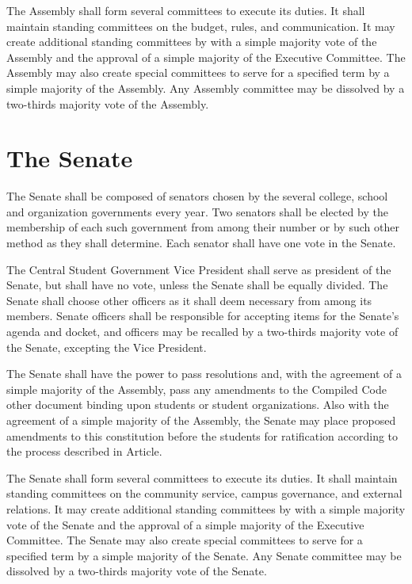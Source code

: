     The Assembly shall form several committees to execute its duties. It shall maintain standing committees on the budget, rules, and communication. It may create additional standing committees by with a simple majority vote of the Assembly and the approval of a simple majority of the Executive Committee. The Assembly may also create special committees to serve for a specified term by a simple majority of the Assembly. Any Assembly committee may be dissolved by a two-thirds majority vote of the Assembly.


\section{The Senate}
    The Senate shall be composed of senators chosen by the several college, school and organization governments every year. Two senators shall be elected by the membership of each such government from among their number or by such other method as they shall determine. Each senator shall have one vote in the Senate.

    The Central Student Government Vice President shall serve as president of the Senate, but shall have no vote, unless the Senate shall be equally divided. The Senate shall choose other officers as it shall deem necessary from among its members. Senate officers shall be responsible for accepting items for the Senate's agenda and docket, and officers may be recalled by a two-thirds majority vote of the Senate, excepting the Vice President.

    The Senate shall have the power to pass resolutions and, with the agreement of a simple majority of the Assembly, pass any amendments to the Compiled Code other document binding upon students or student organizations. Also with the agreement of a simple majority of the Assembly, the Senate may place proposed amendments to this constitution before the students for ratification according to the process described in Article.

    The Senate shall form several committees to execute its duties. It shall maintain standing committees on the community service, campus governance, and external relations. It may create additional standing committees by with a simple majority vote of the Senate and the approval of a simple majority of the Executive Committee. The Senate may also create special committees to serve for a specified term by a simple majority of the Senate. Any Senate committee may be dissolved by a two-thirds majority vote of the Senate.


